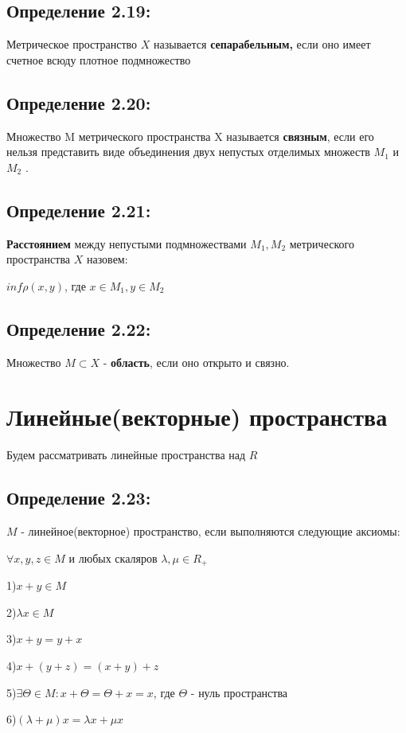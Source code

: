 \documentclass[12pt, english]{article}
\begin{document}
\subsection*{Определение 2.19:}	 	
	 Метрическое пространство $X$ называется \textbf{сепарабельным,}
		если оно имеет счетное всюду плотное подмножество

\subsection*{Определение 2.20:}	 		
	Множество M метрического пространства X называется \textbf{связным}, если его нельзя представить виде объединения двух непустых отделимых множеств $M_1$ и $M_2$ .
		
\subsection*{Определение 2.21:}
	\textbf{Расстоянием} между непустыми подмножествами $M_1, M_2$ метрического пространства $X$ назовем:
	
	$inf \rho(x,y)$, где $x \in M_1 , y \in M_2$
	
\subsection*{Определение 2.22:}
	Множество $M \subset X$ - \textbf{область}, если оно открыто и связно.


\section{Линейные(векторные) пространства}
	Будем рассматривать линейные пространства над $R$
	
\subsection*{Определение 2.23:}
	$M$ - линейное(векторное) пространство, если выполняются следующие аксиомы:
	
	$\forall x,y,z \in M$  и любых скаляров $\lambda,\mu \in R_+$
	
	1)$ x + y \in M$
	
	2)$ \lambda x \in M$
	
	3)$x + y = y + x$
	
	4)$x + (y + z) = (x + y) + z$
	
	5)$\exists \Theta \in M : x + \Theta = \Theta + x = x$, где $\Theta$ - нуль пространства
	
	6)$(\lambda + \mu)x = \lambda x + \mu x$
	
\end{document}
